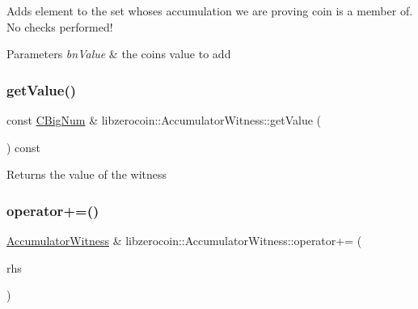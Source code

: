 Adds element to the set whose\textquotesingle{}s accumulation we are proving coin is a member of. No checks performed!


\begin{DoxyParams}{Parameters}
{\em bn\+Value} & the coin\textquotesingle{}s value to add \\
\hline
\end{DoxyParams}
\mbox{\label{classlibzerocoin_1_1_accumulator_witness_af0afa4225f01cd21bdc8e88e310a0168}} 
\subsubsection{\texorpdfstring{get\+Value()}{getValue()}}
{\footnotesize\ttfamily const \mbox{\hyperlink{class_c_big_num}{C\+Big\+Num}} \& libzerocoin\+::\+Accumulator\+Witness\+::get\+Value (\begin{DoxyParamCaption}{ }\end{DoxyParamCaption}) const}

\begin{DoxyReturn}{Returns}
the value of the witness 
\end{DoxyReturn}
\mbox{\label{classlibzerocoin_1_1_accumulator_witness_a57de1414fbb80e5259a76e70b4baa28e}} 
\subsubsection{\texorpdfstring{operator+=()}{operator+=()}}
{\footnotesize\ttfamily \mbox{\hyperlink{classlibzerocoin_1_1_accumulator_witness}{Accumulator\+Witness}} \& libzerocoin\+::\+Accumulator\+Witness\+::operator+= (\begin{DoxyParamCaption}\item[{const \mbox{\hyperlink{classlibzerocoin_1_1_public_coin}{Public\+Coin}} \&}]{rhs }\end{DoxyParamCaption})}

